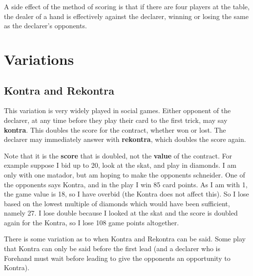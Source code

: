 \documentclass[letter]{article}
\begin{document}
  A side effect of the method of scoring is that if there are four players at
  the table, the dealer of a hand is effectively against the declarer, winning
  or losing the same as the declarer's opponents.

  \section*{Variations}

  \subsection*{Kontra and Rekontra}
  
  This variation is very widely played in social games. Either opponent of the
  declarer, at any time before they play their card to the first trick, may say
  {\bfseries kontra}. This doubles the score for the contract, whether won or
  lost. The declarer may immediately answer with {\bfseries rekontra}, which
  doubles the score again.

  Note that it is the {\bfseries score} that is doubled, not the {\bfseries
  value} of the contract. For example suppose I bid up to 20, look at the skat,
  and play in diamonds. I am only with one matador, but am hoping to make the
  opponents schneider. One of the opponents says Kontra, and in the play I win
  85 card points. As I am with 1, the game value is 18, so I have overbid (the
  Kontra does not affect this).  So I lose based on the lowest multiple of
  diamonds which would have been sufficient, namely 27. I lose double because I
  looked at the skat and the score is doubled again for the Kontra, so I lose
  108 game points altogether.

  There is some variation as to when Kontra and Rekontra can be said. Some play
  that Kontra can only be said before the first lead (and a declarer who is
  Forehand must wait before leading to give the opponents an opportunity to
  Kontra).
\end{document}
